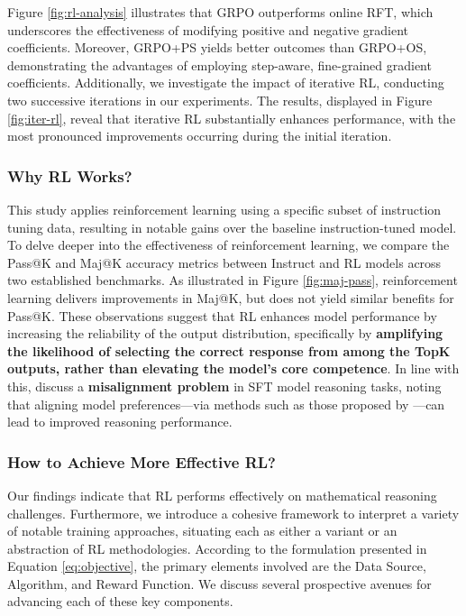 \begin{itemize}[topsep=0pt]
Figure \ref{fig:rl-analysis} illustrates that GRPO outperforms online RFT, which underscores the effectiveness of modifying positive and negative gradient coefficients. Moreover, GRPO+PS yields better outcomes than GRPO+OS, demonstrating the advantages of employing step-aware, fine-grained gradient coefficients. Additionally, we investigate the impact of iterative RL, conducting two successive iterations in our experiments. The results, displayed in Figure \ref{fig:iter-rl}, reveal that iterative RL substantially enhances performance, with the most pronounced improvements occurring during the initial iteration.

\subsubsection{Why RL Works?} This study applies reinforcement learning using a specific subset of instruction tuning data, resulting in notable gains over the baseline instruction-tuned model. To delve deeper into the effectiveness of reinforcement learning, we compare the Pass@K and Maj@K accuracy metrics between Instruct and RL models across two established benchmarks. As illustrated in Figure \ref{fig:maj-pass}, reinforcement learning delivers improvements in Maj@K, but does not yield similar benefits for Pass@K. These observations suggest that RL enhances model performance by increasing the reliability of the output distribution, specifically by \textbf{amplifying the likelihood of selecting the correct response from among the TopK outputs, rather than elevating the model’s core competence}. In line with this, \citep{wang2023making} discuss a \textbf{misalignment problem} in SFT model reasoning tasks, noting that aligning model preferences—via methods such as those proposed by \citep{yuan2023rrhf, song2023preference, wang2023making}—can lead to improved reasoning performance.

\subsubsection{How to Achieve More Effective RL?}
\label{sec:effec_rl}
Our findings indicate that RL performs effectively on mathematical reasoning challenges. Furthermore, we introduce a cohesive framework to interpret a variety of notable training approaches, situating each as either a variant or an abstraction of RL methodologies. According to the formulation presented in Equation \ref{eq:objective}, the primary elements involved are the Data Source, Algorithm, and Reward Function. We discuss several prospective avenues for advancing each of these key components.


\end{itemize}
